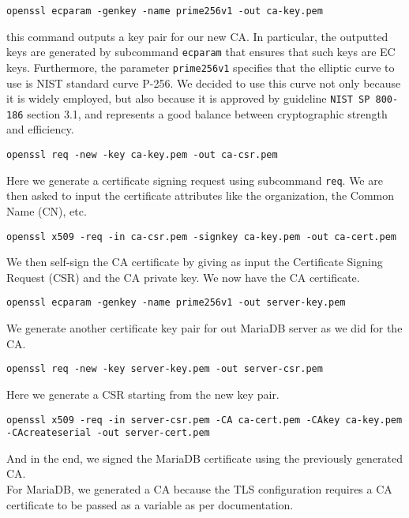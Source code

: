 \begin{center}
    \texttt{openssl ecparam -genkey -name prime256v1 -out ca-key.pem}
\end{center}

this command outputs a key pair for our new CA. In particular, the outputted keys are generated by subcommand \texttt{ecparam} that ensures that such keys are EC keys. Furthermore, the parameter \texttt{prime256v1} specifies that the elliptic curve to use is NIST standard curve P-256. We decided to use this curve not only because it is widely employed, but also because it is approved by guideline \texttt{NIST SP 800-186} section 3.1, and represents a good balance between cryptographic strength and efficiency\cite{article:NistRecCurves}.

\begin{center}
    \texttt{openssl req -new -key ca-key.pem -out ca-csr.pem}
\end{center}

Here we generate a certificate signing request using subcommand \texttt{req}. We are then asked to input the certificate attributes like the organization, the Common Name (CN), etc.

\begin{center}
    \texttt{openssl x509 -req -in ca-csr.pem -signkey ca-key.pem -out ca-cert.pem}
\end{center}

We then self-sign the CA certificate by giving as input the Certificate Signing Request (CSR) and the CA private key. We now have the CA certificate.

\begin{center}
    \texttt{openssl ecparam -genkey -name prime256v1 -out server-key.pem}
\end{center}

We generate another certificate key pair for out MariaDB server as we did for the CA.

\begin{center}
    \texttt{openssl req -new -key server-key.pem -out server-csr.pem}
\end{center}

Here we generate a CSR starting from the new key pair.

\begin{center}
    \texttt{openssl x509 -req -in server-csr.pem -CA ca-cert.pem -CAkey ca-key.pem -CAcreateserial -out server-cert.pem}
\end{center}

And in the end, we signed the MariaDB certificate using the previously generated CA.\\For MariaDB, we generated a CA because the TLS configuration requires a CA certificate to be passed as a variable as per documentation.

